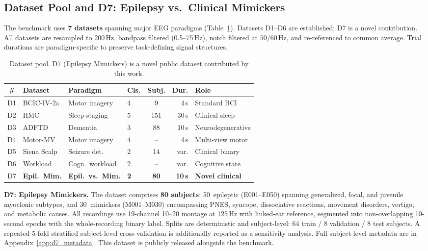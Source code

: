 \documentclass{article}
\begin{document}
\subsection{Dataset Pool and D7: Epilepsy vs.\ Clinical Mimickers}
\label{sec:datasets}

The benchmark uses \textbf{7 datasets} spanning major EEG paradigms (Table~\ref{tab:datasets}). Datasets D1--D6 are established; D7 is a novel contribution. All datasets are resampled to 200\,Hz, bandpass filtered (0.5--75\,Hz), notch filtered at 50/60\,Hz, and re-referenced to common average. Trial durations are paradigm-specific to preserve task-defining signal structures.

\begin{table}[t]
  \caption{Dataset pool. D7 (Epilepsy Mimickers) is a novel public dataset contributed by this work.}
  \label{tab:datasets}
  \centering
  \small
  \begin{tabular}{clllcrl}
    \toprule
    \# & Dataset & Paradigm & Cls. & Subj. & Dur. & Role \\
    \midrule
    D1 & BCIC-IV-2a & Motor imagery & 4 & 9 & 4\,s & Standard BCI \\
    D2 & HMC & Sleep staging & 5 & 151 & 30\,s & Clinical sleep \\
    D3 & ADFTD & Dementia & 3 & 88 & 10\,s & Neurodegenerative \\
    D4 & Motor-MV & Motor imagery & 4 & -- & 4\,s & Multi-view motor \\
    D5 & Siena Scalp & Seizure det. & 2 & 14 & var. & Clinical binary \\
    D6 & Workload & Cogn.\ workload & 2 & -- & var. & Cognitive state \\
    D7 & \textbf{Epil.\ Mim.} & \textbf{Epil.\ vs.\ Mim.} & \textbf{2} & \textbf{80} & \textbf{10\,s} & \textbf{Novel clinical} \\
    \bottomrule
  \end{tabular}
\end{table}

\textbf{D7: Epilepsy Mimickers.}
The dataset comprises \textbf{80 subjects}: 50~epileptic (E001--E050) spanning generalized, focal, and juvenile myoclonic subtypes, and 30~mimickers (M001--M030) encompassing PNES, syncope, dissociative reactions, movement disorders, vertigo, and metabolic causes. All recordings use 19-channel 10--20 montage at 125\,Hz with linked-ear reference, segmented into non-overlapping 10-second epochs with the whole-recording binary label. Splits are deterministic and subject-level: 64 train / 8 validation / 8 test subjects. A repeated 5-fold stratified subject-level cross-validation is additionally reported as a sensitivity analysis. Full subject-level metadata are in Appendix~\ref{app:d7_metadata}. This dataset is publicly released alongside the benchmark.
\end{document}
